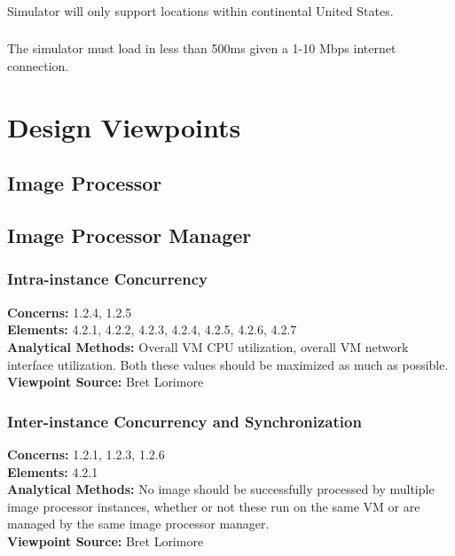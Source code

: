 \documentclass[10pt, onecolumn, draftclsnofoot, letterpaper, compsoc]{IEEEtran}
\begin{document}
    \subsubsection{}
    Simulator will only support locations within continental
    United States. \\
    
    \subsubsection{}
    The simulator must load in less than 500ms given a 1-10
    Mbps internet connection. \\
    

\section{Design Viewpoints}

\subsection{Image Processor}

\subsection{Image Processor Manager}

    \subsubsection{Intra-instance Concurrency}
    \textbf{Concerns:} 1.2.4, 1.2.5 \\
    \textbf{Elements:} 4.2.1, 4.2.2, 4.2.3, 4.2.4, 4.2.5, 4.2.6, 4.2.7 \\
    \textbf{Analytical Methods:} Overall VM CPU utilization, overall VM network interface utilization. 
    Both these values should be maximized as much as possible. \\
    \textbf{Viewpoint Source:} Bret Lorimore \\

    \subsubsection{Inter-instance Concurrency and Synchronization}
    \textbf{Concerns:} 1.2.1, 1.2.3, 1.2.6 \\
    \textbf{Elements:} 4.2.1 \\
    \textbf{Analytical Methods:} No image should be successfully processed by multiple image processor
    instances, whether or not these run on the same VM or are managed by the same image processor manager. \\
    \textbf{Viewpoint Source:} Bret Lorimore \\
\end{document}
